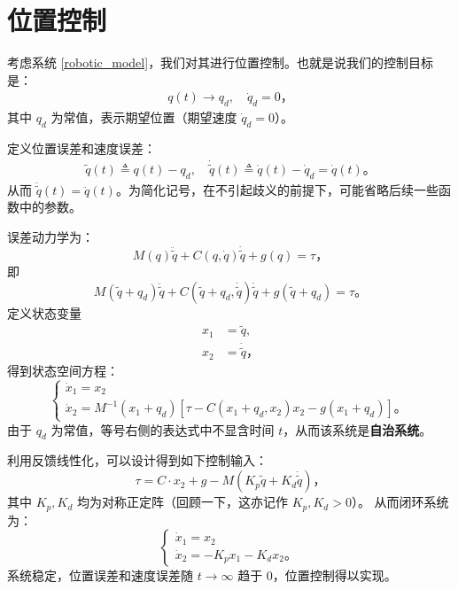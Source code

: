 \section{位置控制}\label{6Bref}

考虑系统 \eqref{robotic_model}，我们对其进行位置控制。也就是说我们的控制目标是：
\begin{align*}
    q(t) \to q_d, \quad \dot{q}_d = 0 \text{，}
\end{align*}
其中 $q_d$ 为常值，表示期望位置（期望速度 $\dot{q}_d = 0$）。

定义位置误差和速度误差：
\begin{align*}
    \tilde{q}(t) \triangleq q(t) - q_d, \quad \dot{\tilde{q}}(t) \triangleq \dot{q}(t) - \dot{q}_d = \dot{q}(t) \text{。}
\end{align*}
从而 $\ddot{\tilde{q}}(t) = \ddot{q}(t)$。为简化记号，在不引起歧义的前提下，可能省略后续一些函数中的参数。

误差动力学为：
\begin{equation*}
    M (q) \ddot{\tilde{q}} + C (q, \dot{q}) \dot{\tilde{q}} + g(q) = \tau \text{，}
\end{equation*}
即
\begin{equation}
    M (\tilde{q} + q_d) \ddot{\tilde{q}} + C (\tilde{q} + q_d, \dot{\tilde{q}}) \dot{\tilde{q}} + g(\tilde{q} + q_d) = \tau \text{。}
\end{equation}
定义状态变量
\begin{align*}
    x_1 &= \tilde{q}, \\
    x_2 &= \dot{\tilde{q}} \text{，}
\end{align*}
得到状态空间方程：
\begin{equation} \label{robotic_state_space}
    \begin{cases}
        \dot{x}_1 = x_2\\
        \dot{x}_2 = M^{- 1} (x_1 + q_d) [\tau - C (x_1 + q_d, x_2) x_2 - g (x_1 + q_d)] \text{。}
    \end{cases}
\end{equation}
由于 $q_d$ 为常值，等号右侧的表达式中不显含时间 $t$，从而该系统是\textbf{自治系统}。

利用反馈线性化，可以设计得到如下控制输入：
\begin{equation} \label{robotic_control_1}
    \tau = C \cdot x_2 + g - M (K_p \tilde{q} + K_d \dot{\tilde{q}})\text{，}
\end{equation}
其中 $K_p, K_d$ 均为对称正定阵（回顾一下，这亦记作 $K_p, K_d > 0$）。
从而闭环系统为：
\[
    \begin{cases}
        \dot{x}_1 = x_2\\
        \dot{x}_2 = - K_p x_1 - K_d x_2 \text{。}
    \end{cases}
\]
系统稳定，位置误差和速度误差随 $t \to \infty$ 趋于 $0$，位置控制得以实现。


